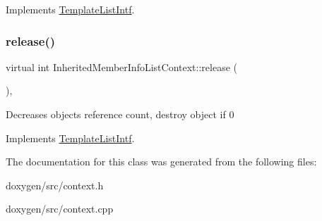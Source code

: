 Implements \mbox{\hyperlink{class_template_list_intf_a56b82384db24c3e121076a1da046d378}{Template\+List\+Intf}}.

\mbox{\label{class_inherited_member_info_list_context_a7a5276e7ac2ff51f66d07715f333cbe7}} 
\subsubsection{\texorpdfstring{release()}{release()}}
{\footnotesize\ttfamily virtual int Inherited\+Member\+Info\+List\+Context\+::release (\begin{DoxyParamCaption}{ }\end{DoxyParamCaption})\hspace{0.3cm}{\ttfamily [inline]}, {\ttfamily [virtual]}}

Decreases object\textquotesingle{}s reference count, destroy object if 0 

Implements \mbox{\hyperlink{class_template_list_intf_a0c53169c740c09dac47efc62bbe39674}{Template\+List\+Intf}}.



The documentation for this class was generated from the following files\+:\begin{DoxyCompactItemize}
\item 
doxygen/src/context.\+h\item 
doxygen/src/context.\+cpp\end{DoxyCompactItemize}
